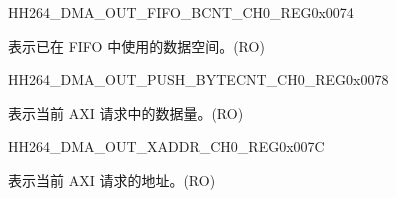     
    \begin{register}{H}{H264\_DMA\_OUT\_FIFO\_BCNT\_CH0\_REG}{0x0074}\label{regdesc:H264DMAOUTFIFOBCNTCH0REG}
    \regnewline%
    \begin{regdesc}\begin{reglist}
    \label{fielddesc:H264DMAOUTCMDFIFOOUTFIFOBCNTCH0}\item [H264\_DMA\_OUT\_CMDFIFO\_OUTFIFO\_BCNT\_CH0] 表示已在 FIFO 中使用的数据空间。(RO)
    \end{reglist}\end{regdesc}
    \end{register}
    
    
    \begin{register}{H}{H264\_DMA\_OUT\_PUSH\_BYTECNT\_CH0\_REG}{0x0078}\label{regdesc:H264DMAOUTPUSHBYTECNTCH0REG}
    \regnewline%
    \begin{regdesc}\begin{reglist}
    \label{fielddesc:H264DMAOUTCMDFIFOPUSHBYTECNTCH0}\item [H264\_DMA\_OUT\_CMDFIFO\_PUSH\_BYTECNT\_CH0] 表示当前 AXI 请求中的数据量。(RO)
    \end{reglist}\end{regdesc}
    \end{register}
    
    
    \begin{register}{H}{H264\_DMA\_OUT\_XADDR\_CH0\_REG}{0x007C}\label{regdesc:H264DMAOUTXADDRCH0REG}
    \regnewline%
    \begin{regdesc}\begin{reglist}
    \label{fielddesc:H264DMAOUTCMDFIFOXADDRCH0}\item [H264\_DMA\_OUT\_CMDFIFO\_XADDR\_CH0] 表示当前 AXI 请求的地址。(RO)
    \end{reglist}\end{regdesc}
    \end{register}
    
